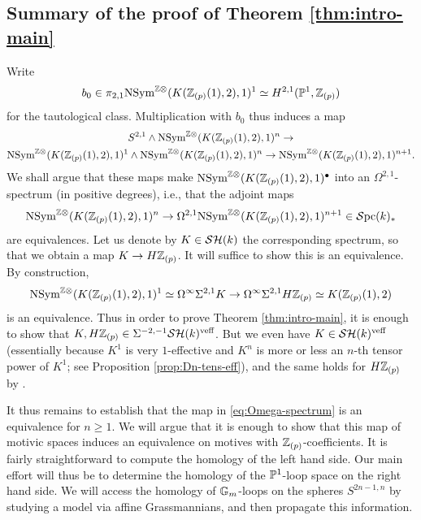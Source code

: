 \documentclass{amsart}
\numberwithin{proposition}{section}
\numberwithin{equation}{section}
\def\NSym{\mathrm{NSym}}
\begin{document}
\subsection{Summary of the proof of Theorem \ref{thm:intro-main}} \label{subsec:into-summary}
Write \[ b_0 \in \pi_{2,1} \NSym^{\Z\otimes}(K(\Z_{(p)}(1),2),1)^1 \wequi H^{2,1}(\P^1, \Z_{(p)}) \] for the tautological class.
Multiplication with $b_0$ thus induces a map \begin{gather*} S^{2,1} \wedge \NSym^{\Z\otimes}(K(\Z_{(p)}(1),2),1)^n \to \\ \NSym^{\Z\otimes}(K(\Z_{(p)}(1),2),1)^1 \wedge \NSym^{\Z\otimes}(K(\Z_{(p)}(1),2),1)^n \to \NSym^{\Z\otimes}(K(\Z_{(p)}(1),2),1)^{n+1}. \end{gather*}
We shall argue that these maps make $\NSym^{\Z\otimes}(K(\Z_{(p)}(1),2),1)^\bullet$ into an $\Omega^{2,1}$-spectrum (in positive degrees), i.e., that the adjoint maps \begin{equation} \label{eq:Omega-spectrum} \NSym^{\Z\otimes}(K(\Z_{(p)}(1),2),1)^n \to \Omega^{2,1} \NSym^{\Z\otimes}(K(\Z_{(p)}(1),2),1)^{n+1} \in \Spc(k)_* \end{equation} are equivalences.
Let us denote by $K \in \SH(k)$ the corresponding spectrum, so that we obtain a map $K \to H\Z_{(p)}$.
It will suffice to show this is an equivalence.
By construction, \[ \NSym^{\Z\otimes}(K(\Z_{(p)}(1),2),1)^1 \wequi \Omega^\infty \Sigma^{2,1} K \to \Omega^\infty \Sigma^{2,1}H\Z_{(p)} \wequi K(\Z_{(p)}(1),2) \] is an equivalence.
Thus in order to prove Theorem \ref{thm:intro-main}, it is enough to show that $K, H\Z_{(p)} \in \Sigma^{-2,-1} \SH(k)^\veff$.
But we even have $K \in \SH(k)^\veff$ (essentially because $K^1$ is very $1$-effective and $K^n$ is more or less an $n$-th tensor power of $K^1$; see Proposition \ref{prop:Dn-tens-eff}), and the same holds for $H\Z_{(p)}$ by \cite[Lemma~13.7]{bachmann-norms}.

It thus remains to establish that the map in \eqref{eq:Omega-spectrum} is an equivalence for $n \ge 1$.
We will argue that it is enough to show that this map of motivic spaces induces an equivalence on motives with $\Z_{(p)}$-coefficients.
It is fairly straightforward to compute the homology of the left hand side.
Our main effort will thus be to determine the homology of the $\P^1$-loop space on the right hand side.
We will access the homology of $\Gm$-loops on the spheres $S^{2n-1,n}$ by studying a model via affine Grassmannians, and then propagate this information.
\end{document}
